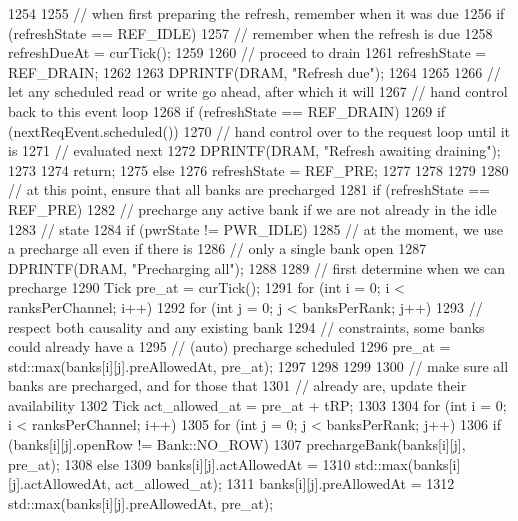 \begin{DoxyCode}
1254 {
1255     // when first preparing the refresh, remember when it was due
1256     if (refreshState == REF_IDLE) {
1257         // remember when the refresh is due
1258         refreshDueAt = curTick();
1259 
1260         // proceed to drain
1261         refreshState = REF_DRAIN;
1262 
1263         DPRINTF(DRAM, "Refresh due\n");
1264     }
1265 
1266     // let any scheduled read or write go ahead, after which it will
1267     // hand control back to this event loop
1268     if (refreshState == REF_DRAIN) {
1269         if (nextReqEvent.scheduled()) {
1270             // hand control over to the request loop until it is
1271             // evaluated next
1272             DPRINTF(DRAM, "Refresh awaiting draining\n");
1273 
1274             return;
1275         } else {
1276             refreshState = REF_PRE;
1277         }
1278     }
1279 
1280     // at this point, ensure that all banks are precharged
1281     if (refreshState == REF_PRE) {
1282         // precharge any active bank if we are not already in the idle
1283         // state
1284         if (pwrState != PWR_IDLE) {
1285             // at the moment, we use a precharge all even if there is
1286             // only a single bank open
1287             DPRINTF(DRAM, "Precharging all\n");
1288 
1289             // first determine when we can precharge
1290             Tick pre_at = curTick();
1291             for (int i = 0; i < ranksPerChannel; i++) {
1292                 for (int j = 0; j < banksPerRank; j++) {
1293                     // respect both causality and any existing bank
1294                     // constraints, some banks could already have a
1295                     // (auto) precharge scheduled
1296                     pre_at = std::max(banks[i][j].preAllowedAt, pre_at);
1297                 }
1298             }
1299 
1300             // make sure all banks are precharged, and for those that
1301             // already are, update their availability
1302             Tick act_allowed_at = pre_at + tRP;
1303 
1304             for (int i = 0; i < ranksPerChannel; i++) {
1305                 for (int j = 0; j < banksPerRank; j++) {
1306                     if (banks[i][j].openRow != Bank::NO_ROW) {
1307                         prechargeBank(banks[i][j], pre_at);
1308                     } else {
1309                         banks[i][j].actAllowedAt =
1310                             std::max(banks[i][j].actAllowedAt, act_allowed_at);
1311                         banks[i][j].preAllowedAt =
1312                             std::max(banks[i][j].preAllowedAt, pre_at);
}}}}}}
\end{DoxyCode}
